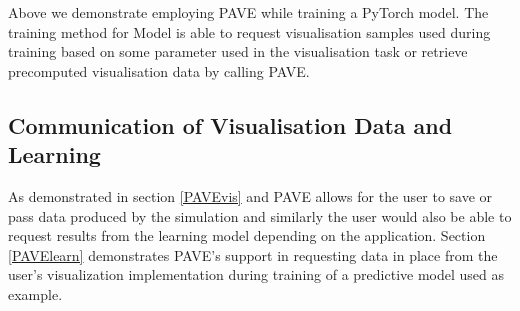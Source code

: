 Above we demonstrate employing PAVE while training a PyTorch model. The training method for Model is able to request visualisation samples used during training based on some parameter used in the visualisation task or retrieve precomputed visualisation data by calling PAVE.
 
\subsection{Communication of Visualisation Data and Learning}

As demonstrated in section \ref{PAVEvis} and PAVE allows for the user to save or pass data produced by the simulation and similarly the user would also be able to request results from the learning model depending on the application. Section \ref{PAVElearn} demonstrates PAVE's support in requesting data in place from the user's visualization implementation during training of a predictive model used as example. 
